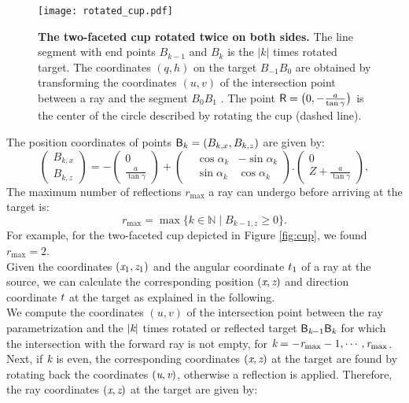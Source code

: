 \begin{figure}[t]%
 \centering
  \texttt{[image: rotated\_cup.pdf]}
 \caption{\textbf{The two-faceted cup rotated twice on both sides.} The line segment with end points $B_{k-1}$ and $B_{k}$ is the $|k|$ times rotated target. The coordinates $(q,h)$ on the target $B_{-1}B_{0}$ are obtained by transforming the coordinates $(u,v)$ of the intersection point between a ray and the segment $B_0B_1$ . The point $\textsf{R} = \big(0,-\frac{a}{\tan{\gamma}}\big)$ is the center of the circle described by rotating the cup (dashed line).}
  \label{fig:twofaced}
  \end{figure}
The position coordinates of points $\textsf{B}_k = (B_{k,x}, B_{k,z})$ are given by:
\begin{equation}
 \begin{pmatrix} B_{k,x}  \\  B_{k,z}\end{pmatrix}= -
  \begin{pmatrix} 0  \\  \frac{a}{\tan\gamma}\end{pmatrix}+
 \left(\begin{split}  & \cos\alpha_k  & -\sin\alpha_k \\  & \sin\alpha_k & \cos\alpha_k\end{split}\right).
 \begin{pmatrix}  0 \\  Z+\frac{a}{\tan\gamma}\end{pmatrix},
\end{equation}
The maximum number of reflections $r_{\textrm{max}}$ a ray can undergo before arriving at the target is:
\begin{equation}
r_{\textrm{max}}=\max\{k\in\mathbb{N} \;| \; B_{k-1,z}\geq 0\}.
\end{equation}
For example, for the two-faceted cup depicted in Figure \ref{fig:cup}, we found $r_{\textrm{max}}=2$.\\ \indent 
Given the coordinates $(\textit{x}_1, \textit{z}_1)$ and the angular coordinate $t_1$ of a ray at the source, we can calculate the corresponding position $(\textit{x}, \textit{z})$ and direction coordinate $t$ at the target as explained in the following. \\ \indent We compute the coordinates $(u,v)$ of the intersection point between the ray parametrization and the $|\textit{k}|$ times rotated or reflected target $\textsf{B}_{\textit{k}-1}\textsf{B}_{\textit{k}}$ for which the intersection with the forward ray is not empty, for $\textit{k}=-\textit{r}_{\textrm{max}}-1, \cdots, \textit{r}_{\textrm{max}}$. Next, if $\textit{k}$ is even, the corresponding coordinates $(\textit{x},\textit{z})$ at the target are found by rotating back the coordinates $(\textit{u},\textit{v})$, otherwise a reflection is applied. Therefore, the ray coordinates $(\textit{x},\textit{z})$ at the target are given by:
